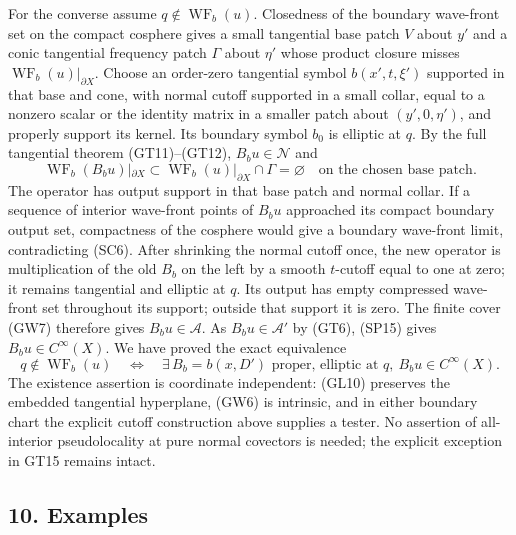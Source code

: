 \documentclass[
  11pt,
]{article}
\makeatletter
\let\ReaderOriginalAnchorStart\hyper@anchorstart
\let\ReaderOriginalAnchorEnd\hyper@anchorend
\let\ReaderPendingAliases\@empty
\def\ReaderArmAliases#1{\gdef\ReaderPendingAliases{#1}}
\def\hyper@anchorstart#1{\ReaderIfNativeAnchorTF{#1}{\ReaderPendingAliases\global\let\ReaderPendingAliases\@empty}{}\ReaderOriginalAnchorStart{#1}}
\makeatother
\begin{document}
For the converse assume \(q\notin\operatorname{WF}_b(u)\). Closedness of
the boundary wave-front set on the compact cosphere gives a small
tangential base patch \(V\) about \(y'\) and a conic tangential
frequency patch \(\Gamma\) about \(\eta'\) whose product closure misses
\(\operatorname{WF}_b(u)|_{\partial X}\). Choose an order-zero
tangential symbol \(b(x',t,\xi')\) supported in that base and cone, with
normal cutoff supported in a small collar, equal to a nonzero scalar or
the identity matrix in a smaller patch about \((y',0,\eta')\), and
properly support its kernel. Its boundary symbol \(b_0\) is elliptic at
\(q\). By the full tangential theorem (GT11)--(GT12),
\(B_bu\in\mathcal N\) and \[
 \operatorname{WF}_b(B_bu)|_{\partial X}
       \subset\operatorname{WF}_b(u)|_{\partial X}
                    \cap\Gamma=\varnothing
 \quad\text{on the chosen base patch}.
 \tag{SC6}
\] The operator has output support in that base patch and normal collar.
If a sequence of interior wave-front points of \(B_bu\) approached its
compact boundary output set, compactness of the cosphere would give a
boundary wave-front limit, contradicting (SC6). After shrinking the
normal cutoff once, the new operator is multiplication of the old
\(B_b\) on the left by a smooth \(t\)-cutoff equal to one at zero; it
remains tangential and elliptic at \(q\). Its output has empty
compressed wave-front set throughout its support; outside that support
it is zero. The finite cover (GW7) therefore gives
\(B_bu\in\mathcal A\). As \(B_bu\in\mathcal A'\) by (GT6), (SP15) gives
\(B_bu\in C^\infty(X)\). We have proved the exact equivalence \[
 q\notin\operatorname{WF}_b(u)
 \quad\Longleftrightarrow\quad
 \exists\,B_b=b(x,D')\text{ proper, elliptic at }q,
             \ B_bu\in C^\infty(X).
 \tag{SC7}
\] The existence assertion is coordinate independent: (GL10) preserves
the embedded tangential hyperplane, (GW6) is intrinsic, and in either
boundary chart the explicit cutoff construction above supplies a tester.
No assertion of all-interior pseudolocality at pure normal covectors is
needed; the explicit exception in GT15 remains intact.

\ReaderArmAliases{\ReaderOriginalAnchorStart{AN03-GBD-010}\ReaderOriginalAnchorEnd\begingroup\expandafter\def\csname @currentHref\endcsname{AN03-GBD-010}\label{AN03-GBD-010}\endgroup\ReaderOriginalAnchorStart{10-examples}\ReaderOriginalAnchorEnd\begingroup\expandafter\def\csname @currentHref\endcsname{10-examples}\label{10-examples}\endgroup}
\subsection{10. Examples}\label{examples}
\end{document}
